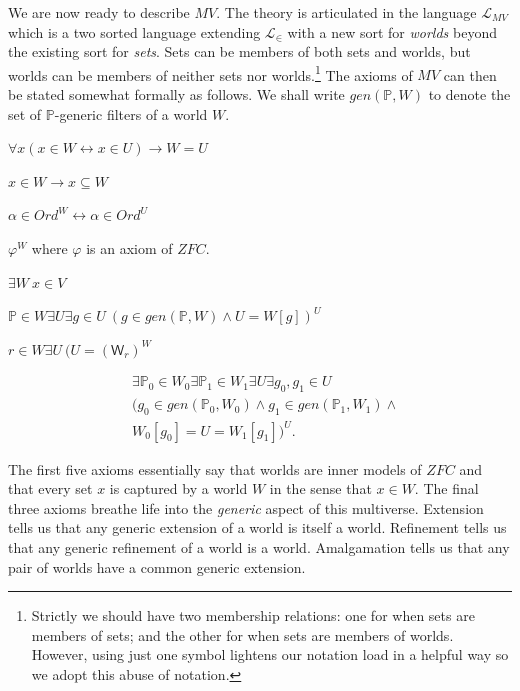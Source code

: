 \documentclass[10pt,a4paper]{amsart}
\numberwithin{equation}{section}
\numberwithin{figure}{section}
\theoremstyle{plain}
\theoremstyle{plain}
\newenvironment{lyxlist}[1]
	{\begin{list}{}
		{\settowidth{\labelwidth}{#1}
		 \setlength{\leftmargin}{\labelwidth}
		 \addtolength{\leftmargin}{\labelsep}
		 \renewcommand{\makelabel}[1]{##1\hfil}}}
	{\end{list}}
\theoremstyle{plain}
\theoremstyle{plain}
\theoremstyle{remark}
\theoremstyle{plain}
\theoremstyle{definition}
\begin{document}
We are now ready to describe $MV$. The theory is articulated in the
language $\mathcal{L}_{MV}$ which is a two sorted language extending
$\mathcal{L}_{\in}$ with a new sort for \emph{worlds} beyond the
existing sort for \emph{sets}. Sets can be members of both sets and
worlds, but worlds can be members of neither sets nor worlds.\footnote{Strictly we should have two membership relations: one for when sets
are members of sets; and the other for when sets are members of worlds.
However, using just one symbol lightens our notation load in a helpful
way so we adopt this abuse of notation. } The axioms of $MV$ can then be stated somewhat formally as follows.
We shall write $gen(\mathbb{P},W)$ to denote the set of $\mathbb{P}$-generic
filters of a world $W$. 
\begin{lyxlist}{00.00.0000}
\item [{(World-extensionality)}] $\forall x(x\in W\leftrightarrow x\in U)\to W=U$
\item [{(World-transitivity)}] $x\in W\to x\subseteq W$
\item [{(World-ordinals)}] $\alpha\in Ord^{W}\leftrightarrow\alpha\in Ord^{U}$
\item [{($ZFC$-worlds)}] $\varphi^{W}$ where $\varphi$ is an axiom of
$ZFC$. 
\item [{(Set-capture)}] $\exists W\ x\in V$
\item [{(Extension)}] $\mathbb{P}\in W\exists U\exists g\in U\ (g\in gen(\mathbb{P},W)\wedge U=W[g])^{U}$
\item [{(Refinement)}] $r\in W\exists U\ (U=(\mathsf{W}_{r})^{W}$
\item [{(Amalgamation)}] 
\begin{align*}
 & \exists\mathbb{P}_{0}\in W_{0}\exists\mathbb{P}_{1}\in W_{1}\exists U\exists g_{0},g_{1}\in U\ \\
 & (g_{0}\in gen(\mathbb{P}_{0},W_{0})\wedge g_{1}\in gen(\mathbb{P}_{1},W_{1})\wedge\\
 & W_{0}[g_{0}]=U=W_{1}[g_{1}])^{U}.
\end{align*}
\end{lyxlist}
The first five axioms essentially say that worlds are inner models
of $ZFC$ and that every set $x$ is captured by a world $W$ in the
sense that $x\in W$. The final three axioms breathe life into the
\emph{generic} aspect of this multiverse. Extension tells us that
any generic extension of a world is itself a world. Refinement tells
us that any generic refinement of a world is a world. Amalgamation
tells us that any pair of worlds have a common generic extension. 
\end{document}
